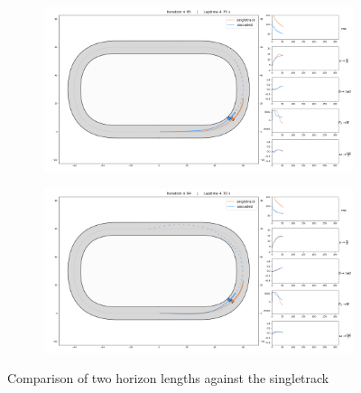 \documentclass[a4paper, onecolumn, 12pt]{article}
\begin{document}
\begin{figure}[H] 
    \centering
        \begin{subfigure}{\textwidth} 
        \centering
        \includegraphics[width=\textwidth]{assets/horizon_shorter.png}
        \label{horizon_shorter}
    \end{subfigure}
    \begin{subfigure}{\textwidth}
        \centering
        \includegraphics[width=\textwidth]{assets/horizon_longer.png}
    \end{subfigure}
    \caption[short]{Comparison of two horizon lengths against the singletrack}
\end{figure}
\end{document}
